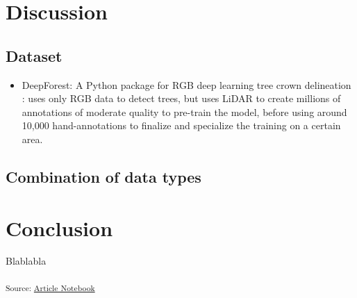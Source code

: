 \documentclass[
  letterpaper,
  DIV=11,
  numbers=noendperiod]{scrartcl}
\providecommand{\tightlist}{%
  \setlength{\itemsep}{0pt}\setlength{\parskip}{0pt}}\usepackage{longtable,booktabs,array}
\begin{document}
\section{Discussion}\label{discussion}

\subsection{Dataset}\label{dataset}

\begin{itemize}
\tightlist
\item
  DeepForest: A Python package for RGB deep learning tree crown
  delineation \autocite{DeepForest}: uses only RGB data to detect trees,
  but uses LiDAR to create millions of annotations of moderate quality
  to pre-train the model, before using around 10,000 hand-annotations to
  finalize and specialize the training on a certain area.
\end{itemize}

\subsection{Combination of data types}\label{combination-of-data-types}

\section*{Conclusion}\label{conclusion}

Blablabla

\textsubscript{Source:
\href{https://ZokszY.github.io/Geodan-internship-report/index.qmd.html}{Article
Notebook}}


\printbibliography[title=Bibliography]
\end{document}
